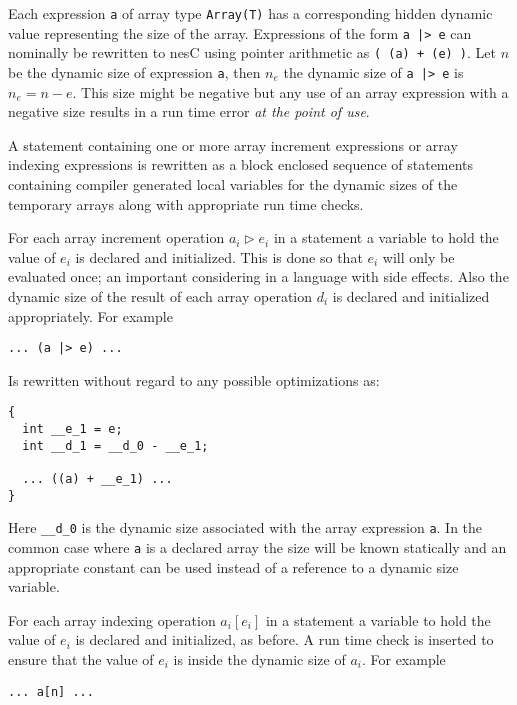 Each expression \texttt{a} of array type \texttt{Array(T)} has a corresponding hidden dynamic
value representing the size of the array. Expressions of the form \texttt{a |> e} can nominally
be rewritten to nesC using pointer arithmetic as \texttt{( (a) + (e) )}. Let $n$ be the dynamic
size of expression \texttt{a}, then $n_e$ the dynamic size of \texttt{a |> e} is $n_e = n - e$.
This size might be negative but any use of an array expression with a negative size results in a
run time error \emph{at the point of use}.

A statement containing one or more array increment expressions or array indexing expressions is
rewritten as a block enclosed sequence of statements containing compiler generated local
variables for the dynamic sizes of the temporary arrays along with appropriate run time checks.

For each array increment operation $a_i \rhd e_i$ in a statement a variable to hold the value of
$e_i$ is declared and initialized. This is done so that $e_i$ will only be evaluated once; an
important considering in a language with side effects. Also the dynamic size of the result of
each array operation $d_i$ is declared and initialized appropriately. For example

\singlespace
\begin{Verbatim}
... (a |> e) ...
\end{Verbatim}
\primaryspacing

Is rewritten without regard to any possible optimizations as:

\singlespace
\begin{Verbatim}
{
  int __e_1 = e;
  int __d_1 = __d_0 - __e_1;

  ... ((a) + __e_1) ...
}
\end{Verbatim}
\primaryspacing

Here \texttt{\_\_d\_0} is the dynamic size associated with the array expression \texttt{a}. In
the common case where \texttt{a} is a declared array the size will be known statically and an
appropriate constant can be used instead of a reference to a dynamic size variable.

For each array indexing operation $a_i[e_i]$ in a statement a variable to hold the value of
$e_i$ is declared and initialized, as before. A run time check is inserted to ensure that
the value of $e_i$ is inside the dynamic size of $a_i$. For example

\singlespace
\begin{Verbatim}
... a[n] ...
\end{Verbatim}
\primaryspacing

